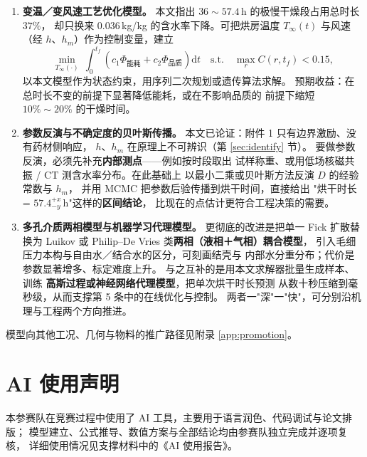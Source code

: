 \documentclass[12pt,a4paper,fontset=none]{ctexart}
\begin{document}
\begin{enumerate}
  \item \textbf{变温／变风速工艺优化模型。}
        本文指出 $36\sim57.4$\,h 的极慢干燥段占用总时长 $37\%$，
        却只换来 $0.036$\,kg/kg 的含水率下降。可把烘房温度
        $T_\infty(t)$ 与风速（经 $h$、$h_m$）作为控制变量，建立
        \[
          \min_{T_\infty(\cdot)}\ \int_0^{t_f}\!\left(c_1\Phi_{\text{能耗}}
          +c_2\Phi_{\text{品质}}\right)\mathrm{d}t
          \quad \text{s.t.}\quad \max_r C(r,t_f)<0.15,
        \]
        以本文模型作为状态约束，用序列二次规划或遗传算法求解。
        预期收益：在总时长不变的前提下显著降低能耗，或在不影响品质的
        前提下缩短 $10\%\sim20\%$ 的干燥时间。

  \item \textbf{参数反演与不确定度的贝叶斯传播。}
        本文已论证：附件 1 只有边界激励、没有药材侧响应，
        $h$、$h_m$ 在原理上不可辨识（第 \ref{sec:identify} 节）。
        要做参数反演，必须先补充\textbf{内部测点}——例如按时段取出
        试样称重、或用低场核磁共振 / CT 测含水率分布。在此基础上
        以最小二乘或贝叶斯方法反演 $D$ 的经验常数与 $h_m$，
        并用 MCMC 把参数后验传播到烘干时间，直接给出
        "烘干时长 = $57.4^{+x}_{-y}$\,h"这样的\textbf{区间结论}，
        比现在的点估计更符合工程决策的需要。

  \item \textbf{多孔介质两相模型与机器学习代理模型。}
        更彻底的改进是把单一 Fick 扩散替换为 Luikov\cite{ref-luikov} 或
        Philip--De Vries\cite{ref-pdv} 类\textbf{两相（液相＋气相）耦合模型}，
        引入毛细压力本构与自由水／结合水的区分，可刻画结壳与
        内部水分重分布；代价是参数显著增多、标定难度上升。
        与之互补的是用本文求解器批量生成样本、训练
        \textbf{高斯过程或神经网络代理模型}，把单次烘干时长预测
        从数十秒压缩到毫秒级，从而支撑第 5 条中的在线优化与控制。
        两者一"深"一"快"，可分别沿机理与工程两个方向推进。
\end{enumerate}

模型向其他工况、几何与物料的推广路径见附录 \ref{app:promotion}。

\section*{AI 使用声明}

本参赛队在竞赛过程中使用了 AI 工具，主要用于语言润色、代码调试与论文排版；
模型建立、公式推导、数值方案与全部结论均由参赛队独立完成并逐项复核，
详细使用情况见支撑材料中的《AI 使用报告》。
\end{document}

